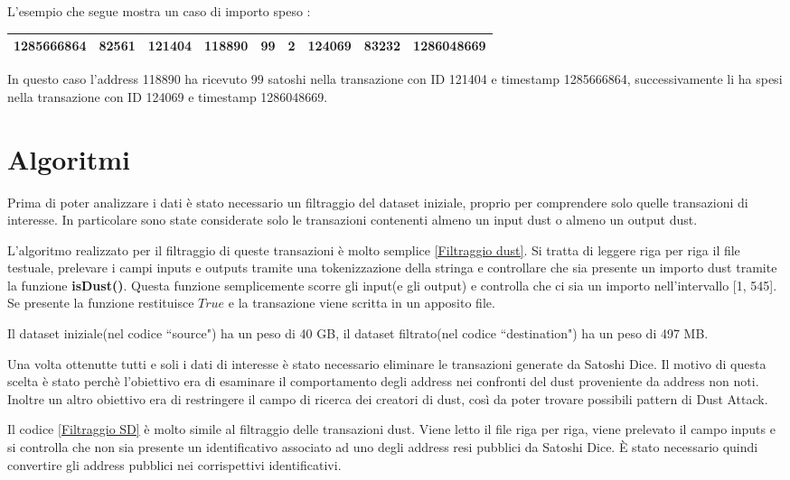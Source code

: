 L'esempio che segue mostra un caso di importo speso :
\begin{table}[h]
\centering
\begin{tabular}{|l|l|l|l|l|l|l|l|l|}
\toprule
1285666864 &    82561 & 121404 &  118890 &      99 &           2 &       124069 &       83232 &      1286048669\\
\bottomrule
\end{tabular}
\end{table}
\FloatBarrier
In questo caso l'address 118890 ha ricevuto 99 satoshi nella transazione con ID 121404 e timestamp 1285666864, successivamente li ha spesi nella transazione con ID 124069 e timestamp 1286048669.
\section{Algoritmi}
Prima di poter analizzare i dati è stato necessario un filtraggio del dataset iniziale, proprio per comprendere solo quelle transazioni di interesse. In particolare sono state considerate solo le transazioni contenenti almeno un input dust o almeno un output dust. 

L'algoritmo realizzato per il filtraggio di queste transazioni è molto semplice \ref{Filtraggio dust}. Si tratta di leggere riga per riga il file testuale, prelevare i campi inputs e outputs tramite una tokenizzazione della stringa e controllare che sia presente un importo dust tramite la funzione \textbf{isDust()}. Questa funzione semplicemente scorre gli input(e gli output) e controlla che ci sia un importo nell'intervallo [1, 545]. Se presente la funzione restituisce $True$ e la transazione viene scritta in un apposito file.

Il dataset iniziale(nel codice ``source") ha un peso di 40 GB, il dataset filtrato(nel codice ``destination") ha un peso di 497 MB. 

Una volta ottenutte tutti e soli i dati di interesse è stato necessario eliminare le transazioni generate da Satoshi Dice. Il motivo di questa scelta è stato perchè l'obiettivo era di esaminare il comportamento degli address nei confronti del dust proveniente da address non noti. Inoltre un altro obiettivo era di restringere il campo di ricerca dei creatori di dust, così da poter trovare possibili pattern di Dust Attack.

Il codice \ref{Filtraggio SD} è molto simile al filtraggio delle transazioni dust. Viene letto il file riga per riga, viene prelevato il campo inputs e si controlla che non sia presente un identificativo associato ad uno degli address resi pubblici da Satoshi Dice. È stato necessario quindi convertire gli address pubblici nei corrispettivi identificativi.

